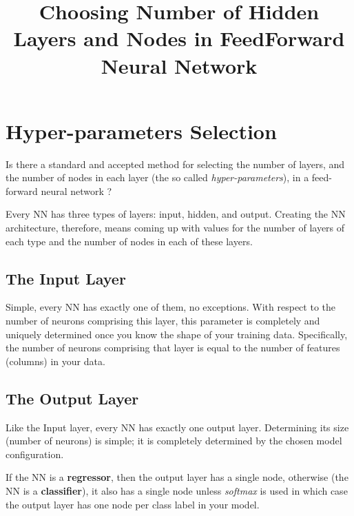 \documentclass[]{scrartcl}
\title{Choosing Number of Hidden Layers and Nodes in FeedForward Neural Network}
\author{}
\begin{document}
\maketitle
\section{Hyper-parameters Selection}

Is there a standard and accepted method for selecting the number of layers, and the number of nodes in each layer (the so called \emph{hyper-parameters}), in a feed-forward neural network ? 



Every NN has three types of layers: input, hidden, and output. Creating the NN architecture, therefore, means coming up with values for the number of layers of each type and the number of nodes in each of these layers.

\subsection*{The Input Layer}

Simple, every NN has exactly one of them, no exceptions. With respect to the number of neurons comprising this layer, this parameter is completely and uniquely determined once you know the shape of your training data. Specifically, the number of neurons comprising that layer is equal to the number of features (columns) in your data. %

\subsection*{The Output Layer}

Like the Input layer, every NN has exactly one output layer. Determining its size (number of neurons) is simple; it is completely determined by the chosen model configuration.

If the NN is a \textbf{regressor}, then the output layer has a single node, otherwise (the NN is a \textbf{classifier}), it also has a single node unless \emph{softmax} is used in which case the output layer has one node per class label in your model.
\end{document}
